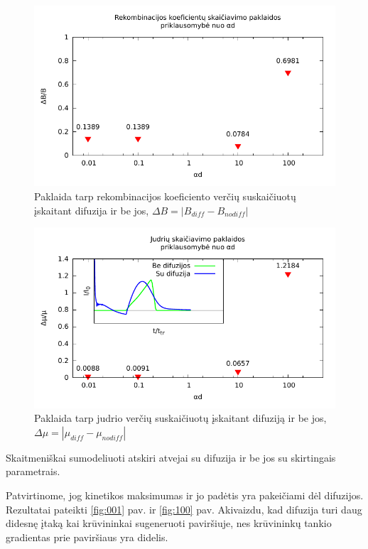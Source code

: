\begin{figure}
  \centering
    \includegraphics[width=\textwidth]{./media/pdf/beta.pdf}
  \caption{Paklaida tarp rekombinacijos koeficiento verčių suskaičiuotų įskaitant difuzija ir be jos, \(\Delta B = |B_{diff} - B_{nodiff}|\)}
  \label{fig:recomb}
\end{figure}
\begin{figure}
  \centering
    \includegraphics[width=\textwidth]{./media/pdf/mu.pdf}
  \caption{Paklaida tarp judrio verčių suskaičiuotų įskaitant difuziją ir be jos, \(\Delta \mu = |\mu_{diff} - \mu_{nodiff}|\)}
  \label{fig:mobility}
\end{figure}

Skaitmeniškai sumodeliuoti atskiri atvejai su difuzija ir be jos su skirtingais parametrais.

Patvirtinome, jog kinetikos maksimumas ir jo padėtis yra pakeičiami dėl difuzijos. Rezultatai pateikti \ref{fig:001} pav. ir \ref{fig:100} pav.
Akivaizdu, kad difuzija turi daug didesnę įtaką kai krūvininkai sugeneruoti paviršiuje, nes krūvininkų tankio gradientas prie paviršiaus yra didelis.

